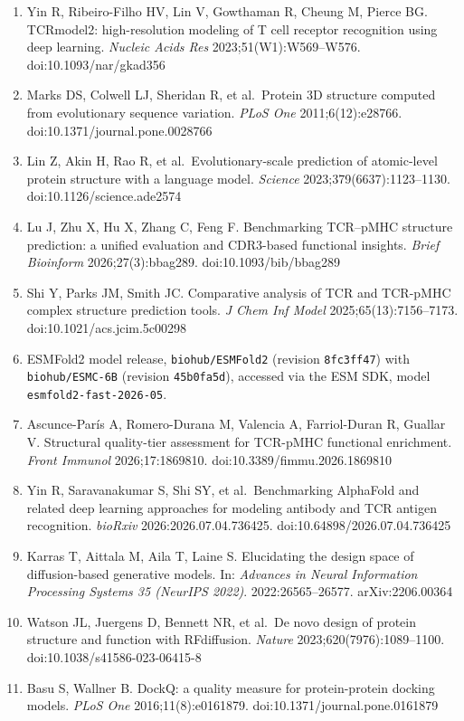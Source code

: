 \documentclass[
  11pt,
]{article}
\begin{document}
\begin{enumerate}
\item
  Yin R, Ribeiro-Filho HV, Lin V, Gowthaman R, Cheung M, Pierce BG. TCRmodel2: high-resolution modeling of T cell receptor recognition using deep learning. \emph{Nucleic Acids Res} 2023;51(W1):W569--W576. doi:10.1093/nar/gkad356
\item
  Marks DS, Colwell LJ, Sheridan R, et al.~Protein 3D structure computed from evolutionary sequence variation. \emph{PLoS One} 2011;6(12):e28766. doi:10.1371/journal.pone.0028766
\item
  Lin Z, Akin H, Rao R, et al.~Evolutionary-scale prediction of atomic-level protein structure with a language model. \emph{Science} 2023;379(6637):1123--1130. doi:10.1126/science.ade2574
\item
  Lu J, Zhu X, Hu X, Zhang C, Feng F. Benchmarking TCR--pMHC structure prediction: a unified evaluation and CDR3-based functional insights. \emph{Brief Bioinform} 2026;27(3):bbag289. doi:10.1093/bib/bbag289
\item
  Shi Y, Parks JM, Smith JC. Comparative analysis of TCR and TCR-pMHC complex structure prediction tools. \emph{J Chem Inf Model} 2025;65(13):7156--7173. doi:10.1021/acs.jcim.5c00298
\item
  ESMFold2 model release, \texttt{biohub/ESMFold2} (revision \texttt{8fc3ff47}) with \texttt{biohub/ESMC-6B} (revision \texttt{45b0fa5d}), accessed via the ESM SDK, model \texttt{esmfold2-fast-2026-05}.
\item
  Ascunce-París A, Romero-Durana M, Valencia A, Farriol-Duran R, Guallar V. Structural quality-tier assessment for TCR-pMHC functional enrichment. \emph{Front Immunol} 2026;17:1869810. doi:10.3389/fimmu.2026.1869810
\item
  Yin R, Saravanakumar S, Shi SY, et al.~Benchmarking AlphaFold and related deep learning approaches for modeling antibody and TCR antigen recognition. \emph{bioRxiv} 2026:2026.07.04.736425. doi:10.64898/2026.07.04.736425
\item
  Karras T, Aittala M, Aila T, Laine S. Elucidating the design space of diffusion-based generative models. In: \emph{Advances in Neural Information Processing Systems 35 (NeurIPS 2022)}. 2022:26565--26577. arXiv:2206.00364
\item
  Watson JL, Juergens D, Bennett NR, et al.~De novo design of protein structure and function with RFdiffusion. \emph{Nature} 2023;620(7976):1089--1100. doi:10.1038/s41586-023-06415-8
\item
  Basu S, Wallner B. DockQ: a quality measure for protein-protein docking models. \emph{PLoS One} 2016;11(8):e0161879. doi:10.1371/journal.pone.0161879

\end{enumerate}
\end{document}
